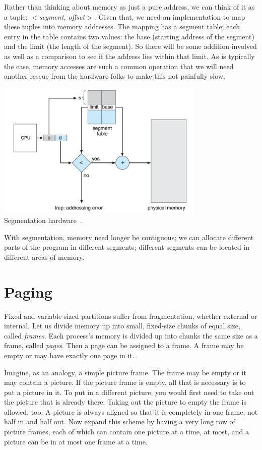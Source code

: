 Rather than thinking about memory as just a pure address, we can think of it as a tuple: \textit{$<$segment, offset$>$}. Given that, we need an implementation to map these tuples into memory addresses. The mapping has a segment table; each entry in the table contains two values: the base (starting address of the segment) and the limit (the length of the segment). So there will be some addition involved as well as a comparison to see if the address lies within that limit. As is typically the case, memory accesses are such a common operation that we will need another rescue from the hardware folks to make this not painfully slow.

\begin{center}
\includegraphics[width=0.75\textwidth]{images/segmentation-hardware.png}\\
Segmentation hardware~\cite{osc}.
\end{center}

With segmentation, memory need longer be contiguous; we can allocate different parts of the program in different segments; different segments can be located in different areas of memory.

\section*{Paging}
Fixed and variable sized partitions suffer from fragmentation, whether external or internal. Let us divide memory up into small, fixed-size chunks of equal size, called \textit{frames}. Each process's memory is divided up into chunks the same size as a frame, called \textit{pages}. Then a page can be assigned to a frame. A frame may be empty or may have exactly one page in it. 

Imagine, as an analogy, a simple picture frame. The frame may be empty or it may contain a picture. If the picture frame is empty, all that is necessary is to put a picture in it. To put in a different picture, you would first need to take out the picture that is already there. Taking out the picture to empty the frame is allowed, too. A picture is always aligned so that it is completely in one frame; not half in and half out. Now expand this scheme by having a very long row of picture frames, each of which can contain one picture at a time, at most, and a picture can be in at most one frame at a time. 

